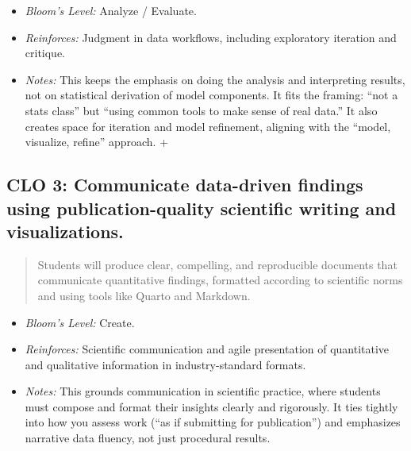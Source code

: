 \documentclass[
  letterpaper,
]{book}
\providecommand{\tightlist}{%
  \setlength{\itemsep}{0pt}\setlength{\parskip}{0pt}}
\begin{document}
\begin{itemize}
\tightlist
\item
  \emph{Bloom's Level:} Analyze / Evaluate.\\
\item
  \emph{Reinforces:} Judgment in data workflows, including exploratory
  iteration and critique.\\
\item
  \emph{Notes:} This keeps the emphasis on doing the analysis and
  interpreting results, not on statistical derivation of model
  components. It fits the framing: ``not a stats class'' but ``using
  common tools to make sense of real data.'' It also creates space for
  iteration and model refinement, aligning with the ``model, visualize,
  refine'' approach. +
\end{itemize}

\subsection*{CLO 3: Communicate data-driven findings using
publication-quality scientific writing and
visualizations.}\label{clo-3-communicate-data-driven-findings-using-publication-quality-scientific-writing-and-visualizations.}

\begin{quote}
Students will produce clear, compelling, and reproducible documents that
communicate quantitative findings, formatted according to scientific
norms and using tools like Quarto and Markdown.
\end{quote}

\begin{itemize}
\tightlist
\item
  \emph{Bloom's Level:} Create.\\
\item
  \emph{Reinforces:} Scientific communication and agile presentation of
  quantitative and qualitative information in industry-standard
  formats.\\
\item
  \emph{Notes:} This grounds communication in scientific practice, where
  students must compose and format their insights clearly and
  rigorously. It ties tightly into how you assess work (``as if
  submitting for publication'') and emphasizes narrative data fluency,
  not just procedural results.
\end{itemize}
\end{document}
